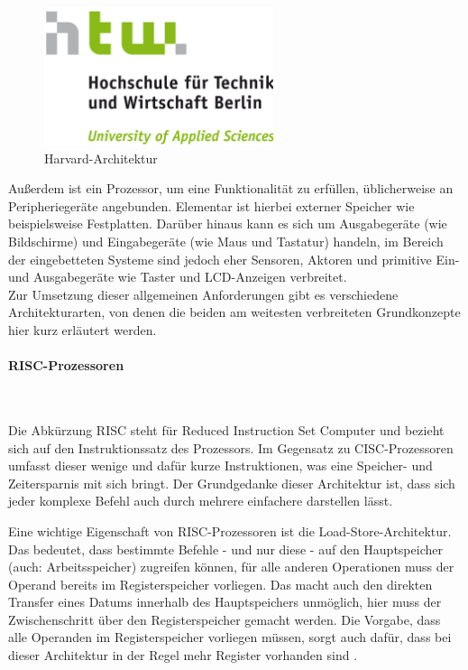 \documentclass[11pt,a4paper,titlepage]{article}
\begin{document}
\begin{figure}[!ht]
\centering
\includegraphics[width=0.6\textwidth]{images/htw_hochschule.png}
\caption{Harvard-Architektur}
\label{img:Harvard}
\end{figure}

Außerdem ist ein Prozessor, um eine Funktionalität zu erfüllen, üblicherweise an Peripheriegeräte angebunden. Elementar ist hierbei externer Speicher wie beispielsweise Festplatten. Darüber hinaus kann es sich um Ausgabegeräte (wie Bildschirme) und Eingabegeräte (wie Maus und Tastatur) handeln, im Bereich der eingebetteten Systeme sind jedoch eher Sensoren, Aktoren und primitive Ein- und Ausgabegeräte wie Taster und LCD-Anzeigen verbreitet.\\

Zur Umsetzung dieser allgemeinen Anforderungen gibt es verschiedene Architekturarten, von denen die beiden am weitesten verbreiteten Grundkonzepte hier kurz erläutert werden.

\paragraph{RISC-Prozessoren}$\;$\\
\label{sec:RISC}

Die Abkürzung RISC steht für Reduced Instruction Set Computer und bezieht sich auf den Instruktionssatz des Prozessors. Im Gegensatz zu CISC-Prozessoren umfasst dieser wenige und dafür kurze Instruktionen, was eine Speicher- und Zeitersparnis mit sich bringt. Der Grundgedanke dieser Architektur ist, dass sich jeder komplexe Befehl auch durch mehrere einfachere darstellen lässt.

Eine wichtige Eigenschaft von RISC-Prozessoren ist die Load-Store-Architektur. Das bedeutet, dass bestimmte Befehle - und nur diese - auf den Hauptspeicher (auch: Arbeitsspeicher) zugreifen können, für alle anderen Operationen muss der Operand bereits im Registerspeicher vorliegen. Das macht auch den direkten Transfer eines Datums innerhalb des Hauptspeichers unmöglich, hier muss der Zwischenschritt über den Registerspeicher gemacht werden. Die Vorgabe, dass alle Operanden im Registerspeicher vorliegen müssen, sorgt auch dafür, dass bei dieser Architektur in der Regel mehr Register vorhanden sind \cite[S. 385]{Hoffmann}.
\end{document}
